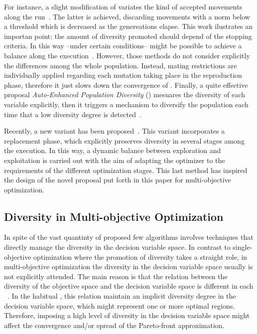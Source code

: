 For instance, a slight modification of \DE{} variates the kind of accepted movements along the run~\cite{montgomery2012simple}.
%
The latter is achieved, discarding movements with a norm below a threshold which is decreased as the genereations elapse.
%
This work ilustrates an importan point; the amount of diversity promoted should depend of the stopping criteria.
%
In this way --under certain conditions-- might be possible to achieve a balance along the execution~\cite{chen2015review, piad2015evolution}.
%
However, those methods do not consider explicitly the differences among the whole population.
%
Instead, mating restrictions are individually applied regarding each mutation taking place in the reproduction phase, therefore it just slows down the convergence of \DE{}.
%
Finally, a quite effective proposal \textit{Auto-Enhanced Population Diversity} (\AEPD{}) mesuares the diversity of each variable explicitly, then it triggers a mechanism to diversify the population each time that a low diversity degree is detected~\cite{yang2014differential}.
%

Recently, a new \DE{} variant has been proposed~\cite{castillo2019differential}.
%
This variant incorporates a replacement phase, which explicitly preserves diversity in several stages among the execution.
%
In this way, a dynamic balance between exploration and exploitation is carried out with the aim of adapting the optimizer to the requirements of the different optimization stages.
%
This last method has inspired the design of the novel proposal put forth in this paper for multi-objective optimization.


\subsection{Diversity in Multi-objective Optimization}\label{MOEAs:Diversity}

In spite of the vast quantinty of proposed \MOEAS{} few algorithms involves techniques that directly manage the diversity in the decision variable space.
%
In contrast to single-objective optimization where the promotion of diversity takes a straight role, in multi-objective optimization the diversity in the decision variable space usually is not explicitly attended.
%
The main reason is that the relation between the diversity of the objective space and the decision variable space is different in each \MOP{}~\cite{shir2009enhancing}.
%
In the habitual \MOPS{}, this relation maintain an implicit diversity degree in the decision variable space, which might represent one or more optimal regions.
%
Therefore, imposing a high level of diversity in the decision variable space might affect the convergence and/or spread of the Pareto-front approximation.
%


